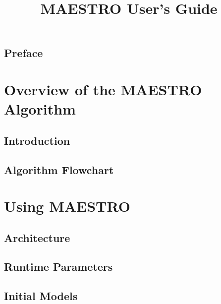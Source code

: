 \documentclass[11pt]{book}
\title{\Huge \bf MAESTRO User's Guide}
\begin{document}
\frontmatter

\maketitle

\setcounter{tocdepth}{1}
\tableofcontents

\listoffigures


\cleardoublepage

\chapter*{Preface}


\mainmatter

\part{Overview of the MAESTRO Algorithm}

\chapter{Introduction}


\chapter{Algorithm Flowchart}


\part{Using MAESTRO}

\chapter{Architecture}


\chapter{Runtime Parameters}



\chapter{Initial Models}

\end{document}
